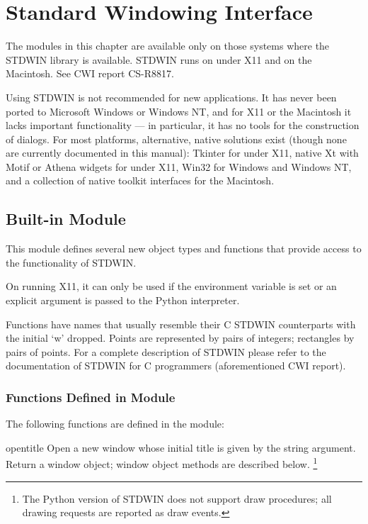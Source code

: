 \chapter{Standard Windowing Interface}

The modules in this chapter are available only on those systems where
the STDWIN library is available.  STDWIN runs on \UNIX{} under X11 and
on the Macintosh.  See CWI report CS-R8817.

 Using STDWIN is not recommended for new
applications.  It has never been ported to Microsoft Windows or
Windows NT, and for X11 or the Macintosh it lacks important
functionality --- in particular, it has no tools for the construction
of dialogs.  For most platforms, alternative, native solutions exist
(though none are currently documented in this manual): Tkinter for
\UNIX{} under X11, native Xt with Motif or Athena widgets for \UNIX{}
under X11, Win32 for Windows and Windows NT, and a collection of
native toolkit interfaces for the Macintosh.

\section{Built-in Module }
\label{module-stdwin}

This module defines several new object types and functions that
provide access to the functionality of STDWIN.

On \UNIX{} running X11, it can only be used if the 
environment variable is set or an explicit  argument is passed to the Python interpreter.

Functions have names that usually resemble their C STDWIN counterparts
with the initial `w' dropped.
Points are represented by pairs of integers; rectangles
by pairs of points.
For a complete description of STDWIN please refer to the documentation
of STDWIN for C programmers (aforementioned CWI report).

\subsection{Functions Defined in Module }

The following functions are defined in the  module:

\begin{funcdesc}{open}{title}
Open a new window whose initial title is given by the string argument.
Return a window object; window object methods are described below.%
\footnote{The Python version of STDWIN does not support draw procedures; all
	drawing requests are reported as draw events.}
\end{funcdesc}

